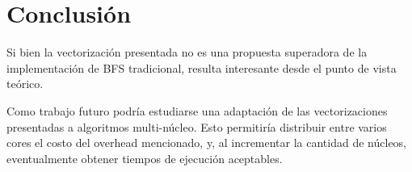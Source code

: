 \section{Conclusión}

Si bien la vectorización presentada no es una propuesta superadora de la implementación de BFS tradicional, resulta interesante desde el punto de vista teórico.

Como trabajo futuro podría estudiarse una adaptación de las vectorizaciones presentadas a algoritmos multi-núcleo. Esto permitiría distribuir entre varios cores el costo del overhead mencionado, y, al incrementar la cantidad de núcleos, eventualmente obtener tiempos de ejecución aceptables.

